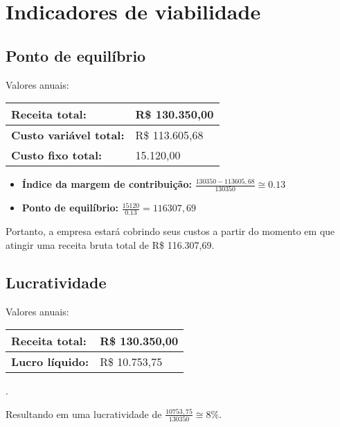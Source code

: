 \section{Indicadores de viabilidade}

  \subsection{Ponto de equilíbrio}
  
  Valores anuais:
  \newline \newline
  \begin{tabular}{| l | l |}
    \hline
    \textbf{Receita total:} & R\$ 130.350,00 \\ \hline
    \textbf{Custo variável total:} & R\$ 113.605,68 \\ \hline
    \textbf{Custo fixo total:} & 15.120,00 \\ \hline
  \end{tabular}
  
  \begin{itemize}
    \item \textbf{Índice da margem de contribuição:} $\frac{130350 - 113605,68}{130350} \cong 0.13$
    \item \textbf{Ponto de equilíbrio:} $\frac{15120}{0.13} = 116307,69$
  \end{itemize}
  
  Portanto, a empresa estará cobrindo seus custos a partir do momento em que atingir uma receita bruta total de R\$ 116.307,69.
  
  \subsection{Lucratividade}
  
  Valores anuais:
  \newline \newline
  \begin{tabular}{| l | l |}
    \hline
    \textbf{Receita total:} & R\$ 130.350,00 \\ \hline
    \textbf{Lucro líquido:} & R\$ 10.753,75 \\ \hline
  \end{tabular}
  
  .\newline \newline
  
  Resultando em uma lucratividade de $\frac{10753,75}{130350} \cong 8\%$.
  
